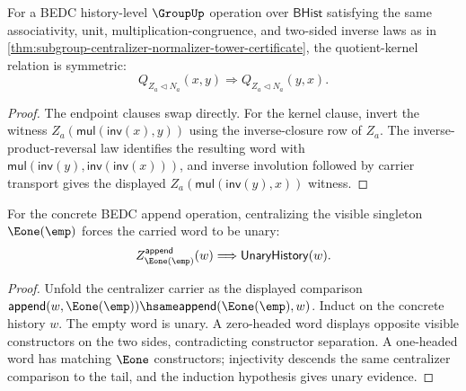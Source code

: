 \begin{theorem}
\label{thm:subgroup-centralizer-quotient-kernel-symm}
For a BEDC history-level $\GroupUp$ operation over $\mathsf{BHist}$ satisfying
the same associativity, unit, multiplication-congruence, and two-sided inverse
laws as in
\autoref{thm:subgroup-centralizer-normalizer-tower-certificate}, the
quotient-kernel relation is symmetric:
$$
Q_{Z_a\triangleleft N_a}(x,y)\Longrightarrow
Q_{Z_a\triangleleft N_a}(y,x).
$$
\end{theorem}
\begin{proof}
The endpoint clauses swap directly. For the kernel clause, invert the witness
$Z_a(\mathsf{mul}(\mathsf{inv}(x),y))$ using the inverse-closure row of
$Z_a$. The inverse-product-reversal law identifies the resulting word with
$\mathsf{mul}(\mathsf{inv}(y),\mathsf{inv}(\mathsf{inv}(x)))$, and inverse
involution followed by carrier transport gives the displayed
$Z_a(\mathsf{mul}(\mathsf{inv}(y),x))$ witness.
\end{proof}

\begin{theorem}
\label{thm:subgroup-centralizer-carrier-append-e1-unit-unary}
For the concrete BEDC append operation, centralizing the visible singleton
$\Eone(\emp)$ forces the carried word to be unary:
$$
Z_{\Eone(\emp)}^{\mathsf{append}}(w)
\Longrightarrow
\mathsf{UnaryHistory}(w).
$$
\end{theorem}
\begin{proof}
Unfold the centralizer carrier as the displayed comparison
$\mathsf{append}(w,\Eone(\emp))\hsame
\mathsf{append}(\Eone(\emp),w)$. Induct on the concrete history $w$. The
empty word is unary. A zero-headed word displays opposite visible constructors
on the two sides, contradicting constructor separation. A one-headed word has
matching $\Eone$ constructors; injectivity descends the same centralizer
comparison to the tail, and the induction hypothesis gives unary evidence.
\end{proof}

